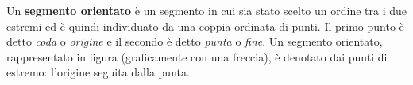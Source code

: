 
\begin{definizione}
  Un \textbf{segmento orientato} è un segmento in cui sia stato scelto un 
ordine tra i due estremi ed è quindi individuato da una coppia ordinata di 
punti. Il primo punto è detto \textit{coda} o \textit{origine} e il secondo è 
detto \textit{punta}  o \textit{fine}. 
  Un segmento orientato, rappresentato in figura (graficamente con una 
freccia), è denotato dai punti di estremo: l'origine seguita dalla punta.   
\end{definizione}
\begin{figure}[htbp]
\begin{center}
{\small
\begin{inaccessibleblock}
{}
\end{inaccessibleblock}
}
\end{center}
\end{figure}

